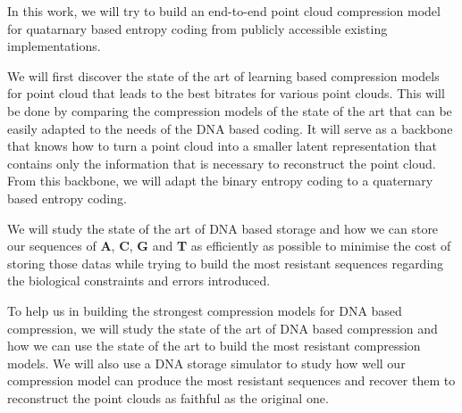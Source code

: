 
\newcommand{\ACGT}{\textbf{A}, \textbf{C}, \textbf{G} and \textbf{T}}

In this work, we will try to build an end-to-end point cloud compression model for quatarnary based entropy coding from publicly accessible existing implementations.

We will first discover the state of the art of learning based compression models for point cloud that leads to the best bitrates for various point clouds.
This will be done by comparing the compression models of the state of the art that can be easily adapted to the needs of the DNA based coding.
It will serve as a backbone that knows how to turn a point cloud into a smaller latent representation that contains only the information that is necessary to reconstruct the point cloud.
From this backbone, we will adapt the binary entropy coding to a quaternary based entropy coding.

We will study the state of the art of DNA based storage and how we can store our sequences of \ACGT{} as efficiently as possible to minimise the cost of storing those datas while trying to build the most resistant sequences regarding the biological constraints and errors introduced.

To help us in building the strongest compression models for DNA based compression, we will study the state of the art of DNA based compression and how we can use the state of the art to build the most resistant compression models.
We will also use a DNA storage simulator to study how well our compression model can produce the most resistant sequences and recover them to reconstruct the point clouds as faithful as the original one.
